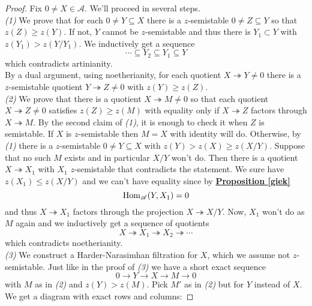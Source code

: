 \begin{proof}
  Fix $0 \not = X \in \mathscr{A}$. We'll proceed in several steps.\\
  
 \textit{(1)} We prove that for each $0 \not=Y \subseteq X$ there is a $z$-semistable $0 \not = Z \subseteq Y$ so that $z(Z) \ge z(Y)$. If not, $Y$ cannot be $z$-semistable and thus there is $Y_1 \subset Y$ with $z(Y_1)>z(Y/Y_1)$. We inductively get a sequence $$\cdots \subseteq Y_2 \subseteq Y_1 \subseteq Y$$ which contradicts artinianity. \\
 By a dual argument, using noetherianity, for each quotient $X \twoheadrightarrow Y \not = 0 $ there is a $z$-semistable quotient $Y \twoheadrightarrow Z \not = 0$ with $z(Y) \ge z(Z)$. \\

 \textit{(2)} We prove that there is a quotient $X \twoheadrightarrow M \not = 0$  so that each quotient $X \twoheadrightarrow Z \not = 0$ satisfies $z(Z) \ge z(M)$ with equality only if $X \twoheadrightarrow Z$ factors through $X \twoheadrightarrow M$. By the second claim of \textit{(1)}, it is enough to check it when $Z$ is semistable. If $X$ is $z$-semistable then $M=X$ with identity will do. Otherwise, by \textit{(1)} there is a $z$-semistable $0 \not = Y \subseteq X$ with $z(Y) > z(X) \ge z(X/Y)$. Suppose that no such $M$ exists and in particular $X/Y$ won't do. Then there is a quotient $X \twoheadrightarrow X_1$ with $X_1$ $z$-semistable that contradicts the statement. We sure have $z(X_1) \le z(X/Y)$ and we can't have equality since by \hyperref[giek]{\textbf{Proposition \ref*{giek}}} $$\textnormal{Hom}_{\mathscr{A}}(Y,X_1)=0$$
 and thus $X \twoheadrightarrow X_1$ factors through the projection $X \twoheadrightarrow X/Y$. Now, $X_1$ won't do as $M$ again and we inductively get a sequence of quotients $$X \twoheadrightarrow X_1 \twoheadrightarrow X_2 \twoheadrightarrow \cdots$$
 which contradicts noetherianity. \\

 \textit{(3)} We construct a Harder-Narasimhan filtration for $X$, which we assume not $z$-semistable. Just like in the proof of \textit{(3)} we have a short exact sequence $$0 \longrightarrow Y \longrightarrow X \longrightarrow M \longrightarrow 0$$
 with $M$ as in \textit{(2)} and $z(Y)>z(M)$. Pick $M'$ as in \textit{(2)} but for $Y$ instead of $X$. We get a diagram with exact rows and columns: 
 

\end{proof}
